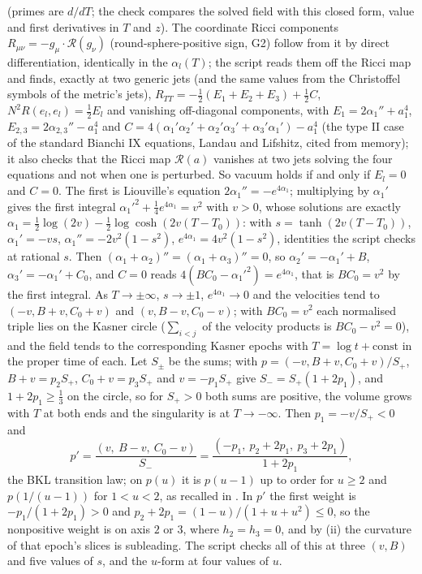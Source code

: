 (primes are $d/dT$; the check compares the solved field with this closed form, value and first derivatives in $T$ and $z$). The coordinate Ricci components $R_{\mu\nu} = -g_{\mu}\cdot\mathcal{R}(g_{\nu})$ (round-sphere-positive sign, G2) follow from it by direct differentiation, identically in the $\alpha_{l}(T)$; the script reads them off the Ricci map and finds, exactly at two generic jets (and the same values from the Christoffel symbols of the metric's jets), $R_{TT} = -\tfrac12(E_{1} + E_{2} + E_{3}) + \tfrac12 C$, $N^{2}R(e_{l}, e_{l}) = \tfrac12E_{l}$ and vanishing off-diagonal components, with $E_{1} = 2\alpha_{1}'' + a_{1}^{4}$, $E_{2,3} = 2\alpha_{2,3}'' - a_{1}^{4}$ and $C = 4(\alpha_{1}'\alpha_{2}' + \alpha_{2}'\alpha_{3}' + \alpha_{3}'\alpha_{1}') - a_{1}^{4}$ (the type II case of the standard Bianchi IX equations, Landau and Lifshitz, cited from memory); it also checks that the Ricci map $\mathcal{R}(a)$ vanishes at two jets solving the four equations and not when one is perturbed. So vacuum holds if and only if $E_{l} = 0$ and $C = 0$. The first is Liouville's equation $2\alpha_{1}'' = -e^{4\alpha_{1}}$; multiplying by $\alpha_{1}'$ gives the first integral $\alpha_{1}'^{2} + \tfrac14 e^{4\alpha_{1}} = v^{2}$ with $v > 0$, whose solutions are exactly $\alpha_{1} = \tfrac12\log(2v) - \tfrac12\log\cosh(2v(T - T_{0}))$: with $s = \tanh(2v(T - T_{0}))$, $\alpha_{1}' = -vs$, $\alpha_{1}'' = -2v^{2}(1 - s^{2})$, $e^{4\alpha_{1}} = 4v^{2}(1 - s^{2})$, identities the script checks at rational $s$. Then $(\alpha_{1} + \alpha_{2})'' = (\alpha_{1} + \alpha_{3})'' = 0$, so $\alpha_{2}' = -\alpha_{1}' + B$, $\alpha_{3}' = -\alpha_{1}' + C_{0}$, and $C = 0$ reads $4(BC_{0} - \alpha_{1}'^{2}) = e^{4\alpha_{1}}$, that is $BC_{0} = v^{2}$ by the first integral. As $T \to \pm\infty$, $s \to \pm1$, $e^{4\alpha_{1}} \to 0$ and the velocities tend to $(-v, B + v, C_{0} + v)$ and $(v, B - v, C_{0} - v)$; with $BC_{0} = v^{2}$ each normalised triple lies on the Kasner circle ($\sum_{i<j}$ of the velocity products is $BC_{0} - v^{2} = 0$), and the field tends to the corresponding Kasner epochs with $T = \log t + \mathrm{const}$ in the proper time of each. Let $S_{\pm}$ be the sums; with $p = (-v, B + v, C_{0} + v)/S_{+}$, $B + v = p_{2}S_{+}$, $C_{0} + v = p_{3}S_{+}$ and $v = -p_{1}S_{+}$ give $S_{-} = S_{+}(1 + 2p_{1})$, and $1 + 2p_{1} \geq \tfrac13$ on the circle, so for $S_{+} > 0$ both sums are positive, the volume grows with $T$ at both ends and the singularity is at $T \to -\infty$. Then $p_{1} = -v/S_{+} < 0$ and
\[
p' = \frac{(v,\ B - v,\ C_{0} - v)}{S_{-}} = \frac{(-p_{1},\ p_{2} + 2p_{1},\ p_{3} + 2p_{1})}{1 + 2p_{1}},
\]
the BKL transition law; on $p(u)$ it is $p(u - 1)$ up to order for $u \geq 2$ and $p(1/(u - 1))$ for $1 < u < 2$, as recalled in . In $p'$ the first weight is $-p_{1}/(1 + 2p_{1}) > 0$ and $p_{2} + 2p_{1} = (1 - u)/(1 + u + u^{2}) \leq 0$, so the nonpositive weight is on axis $2$ or $3$, where $h_{2} = h_{3} = 0$, and by (ii) the curvature of that epoch's slices is subleading. The script checks all of this at three $(v, B)$ and five values of $s$, and the $u$-form at four values of $u$.
